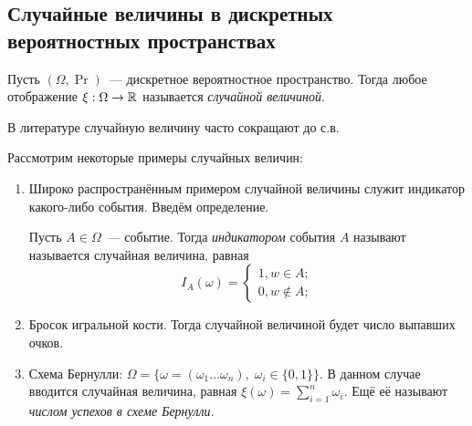 \subsection{Случайные величины в дискретных вероятностных пространствах}
\begin{definition}
    Пусть \((\Omega, \Pr)\)~--- дискретное вероятностное пространство. Тогда любое отображение \(\xi : \Omega \to \mathbb{R}\) называется \emph{случайной величиной}.
\end{definition}
\begin{remark}
    В литературе случайную величину часто сокращают до с.в.
\end{remark}
Рассмотрим некоторые примеры случайных величин:
\begin{enumerate}
    \item Широко распространённым примером случайной величины служит индикатор какого-либо события. Введём определение.
    \begin{definition}
        Пусть \(A \in \Omega\)~--- событие. Тогда \emph{индикатором} события \(A\) называют называется случайная величина, равная \[I_A(\omega) = \begin{cases}
        1, w \in A; \\
        0, w \not\in A;
        \end{cases}\]
    \end{definition}
    
    \item Бросок игральной кости. Тогда случайной величиной будет число выпавших очков.
    
    \item Схема Бернулли: \(\Omega = \{\omega = (\omega_1 \ldots \omega_n),\; \omega_i \in \{0, 1\} \}\). В данном случае вводится случайная величина, равная \(\xi(\omega) = \sum\limits_{i=1}^{n}\omega_i\). Ещё её называют \emph{числом успехов в схеме Бернулли}.
\end{enumerate}